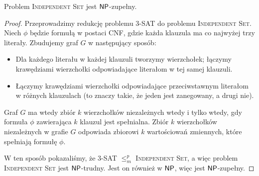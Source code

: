\begin{theorem}
    Problem \textsc{Independent Set} jest $\textsf{NP}$-zupełny.
\end{theorem}
\begin{proof}
    Przeprowadzimy redukcję problemu 3-SAT do problemu \textsc{Independent Set}. Niech $\phi$ będzie formułą w postaci CNF, gdzie każda klauzula ma co najwyżej trzy literały. Zbudujemy graf $G$ w następujący sposób:
    \begin{itemize}
        \item Dla każdego literału w każdej klauzuli tworzymy wierzchołek; łączymy krawędziami wierzchołki odpowiadające literałom w tej samej klauzuli.
        \item Łączymy krawędziami wierzchołki odpowiadające przeciwstawnym literałom w różnych klauzulach (to znaczy takie, że jeden jest zanegowany, a drugi nie).
    \end{itemize}
    Graf $G$ ma wtedy zbiór $k$ wierzchołków niezależnych wtedy i tylko wtedy, gdy formuła $\phi$ zawierająca $k$ klauzul jest spełnialna. Zbiór $k$ wierzchołków niezależnych w grafie $G$ odpowiada zbiorowi $k$ wartościowań zmiennych, które spełniają formułę $\phi$.

    W ten sposób pokazaliśmy, że 3-SAT $\leq_m^p$ \textsc{Independent Set}, a więc problem \textsc{Independent Set} jest $\textsf{NP}$-trudny. Jest on również w $\textsf{NP}$, więc jest $\textsf{NP}$-zupełny.
\end{proof}

